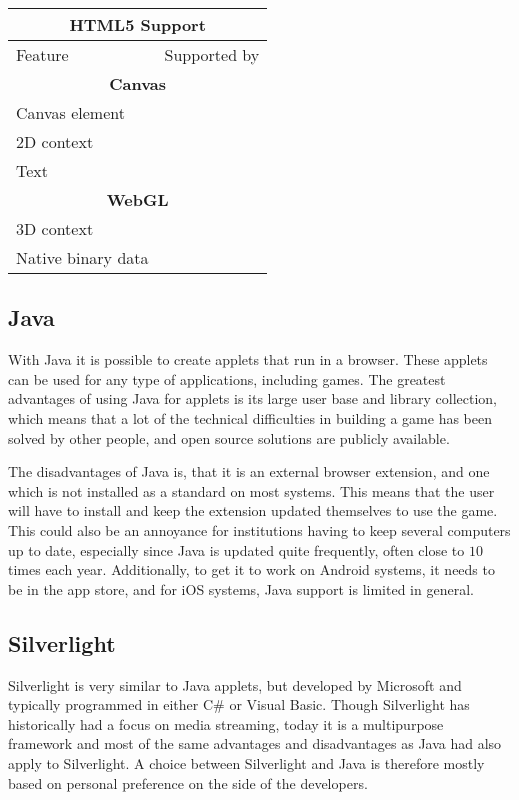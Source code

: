 \begin{center}
\begin{tabular}{|l|l|}
\hline
\multicolumn{2}{|c|}{HTML5 Support}\\
\hline
Feature & Supported by \\ \hline

\multicolumn{2}{|c|}{\textbf{Canvas}} \\ \hline
Canvas element &  \\
2D context     &  \\
Text           &  \\ \hline
\multicolumn{2}{|c|}{\textbf{WebGL}}  \\ \hline
3D context & \\
Native binary data & \\\hline
\end{tabular}
\end{center}

\subsection{Java}
With Java it is possible to create applets that run in a browser.\cite{java13} These applets can be used for any type of applications, including games.
The greatest advantages of using Java for applets is its large user base and library collection, which means that a lot of the technical difficulties in building a game has been solved by other people, and open source solutions are publicly available.

The disadvantages of Java is, that it is an external browser extension, and one which is not installed as a standard on most systems.
This means that the user will have to install and keep the extension updated themselves to use the game. 
This could also be an annoyance for institutions having to keep several computers up to date, especially since Java is updated quite frequently, often close to $10$ times each year.\cite{javahistory13}
Additionally, to get it to work on Android systems, it needs to be in the app store, and for iOS systems, Java support is limited in general.

\subsection{Silverlight}
Silverlight is very similar to Java applets, but developed by Microsoft and typically programmed in either C\# or Visual Basic.\cite{silverlight13}
Though Silverlight has historically had a focus on media streaming, today it is a multipurpose framework and most of the same advantages and disadvantages as Java had also apply to Silverlight.
A choice between Silverlight and Java is therefore mostly based on personal preference on the side of the developers.

